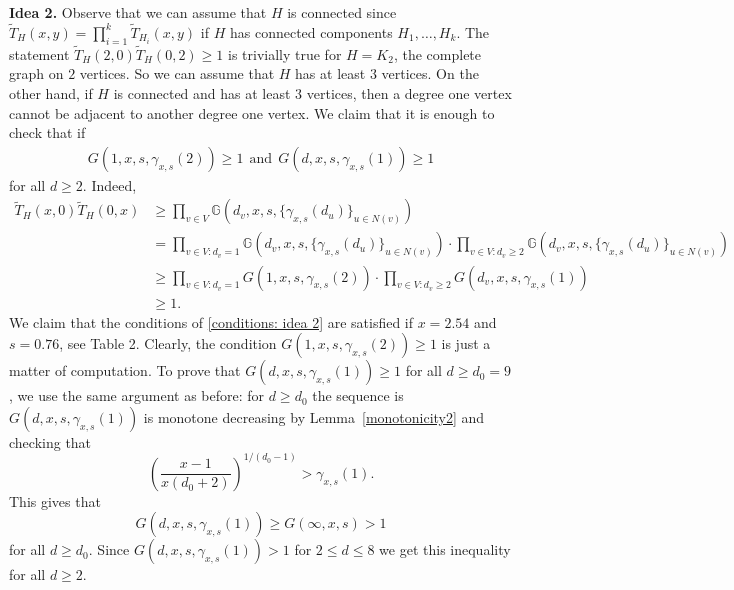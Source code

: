 \documentclass[12pt,a4paper]{amsart}
\numberwithin{equation}{section}
\theoremstyle{plain}
\theoremstyle{definition}
\newcommand{\1}{\textbf{1}}
\newcommand{\wT}{\widetilde{T}}
\begin{document}
\noindent \textbf{Idea 2.}  Observe that we can assume that $H$ is connected since 
$\wT_H(x,y)=\prod_{i=1}^k\wT_{H_i}(x,y)$
if $H$ has connected components $H_1,\dots ,H_k$. 
The statement $\wT_H(2,0)\wT_H(0,2)\geqslant1$ is trivially true for $H=K_2$, the complete graph on $2$ vertices. So we can assume that $H$ has at least $3$ vertices.  On the other hand, if $H$ is connected and has at least $3$ vertices, then a degree one vertex cannot be adjacent to another degree one vertex. We claim that  it is enough to check that if
\begin{align} \label{conditions: idea 2}
G(1,x,s,\gamma_{x,s}(2))\geqslant1\ \ \text{and}\ \ G(d,x,s,\gamma_{x,s}(1))\geqslant1
\end{align}
for all $d\geqslant2$.  Indeed,
\begin{align*}
\widetilde{T}_H(x,0)\widetilde{T}_H(0,x)&\geqslant\prod_{v\in V}\mathbb{G}\left(d_v,x,s,\{\gamma_{x,s}(d_u)\}_{u\in N(v)}\right)\\
&=\prod_{v\in V: d_v=1}\mathbb{G}\left(d_v,x,s,\{\gamma_{x,s}(d_u)\}_{u\in N(v)}\right)\cdot \prod_{v\in V: d_v\geqslant2}\mathbb{G}\left(d_v,x,s,\{\gamma_{x,s}(d_u)\}_{u\in N(v)}\right)\\
&\geqslant \prod_{v\in V: d_v=1}G(1,x,s,\gamma_{x,s}(2))\cdot \prod_{v\in V: d_v\geqslant2}G(d_v,x,s,\gamma_{x,s}(1))\\
&\geqslant1.
\end{align*}
We claim that the conditions of \ref{conditions: idea 2} are satisfied if $x=2.54$ and $s=0.76$, see Table 2. Clearly, the condition $G(1,x,s,\gamma_{x,s}(2))\geqslant 1$ is just a matter of computation. To prove that $G(d,x,s,\gamma_{x,s}(1))\geqslant 1$ for all $d\geqslant d_0=9$, we use the same argument as before: for $d\geqslant d_0$ the sequence is $G(d,x,s,\gamma_{x,s}(1))$ is monotone decreasing by Lemma~\ref{monotonicity2} and checking that
$$\left(\frac{x-1}{x(d_0+2)}\right)^{1/(d_0-1)} > \gamma_{x,s}(1).$$
This gives that 
$$G(d,x,s,\gamma_{x,s}(1))\geqslant G(\infty,x,s)>1$$
for all $d\geqslant d_0$. Since $G(d,x,s,\gamma_{x,s}(1))>1$ for $2\leqslant   d\leqslant   8$ we get this inequality for all $d\geqslant 2$.


\bigskip
\end{document}
